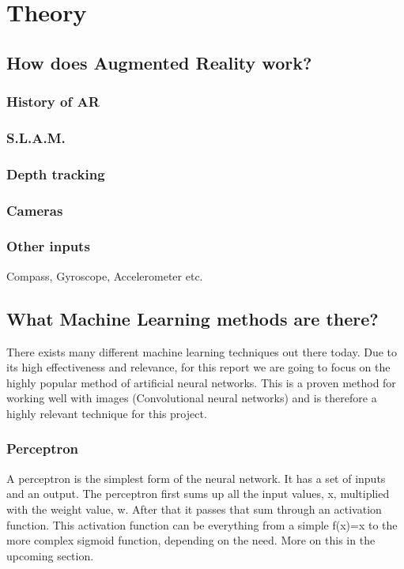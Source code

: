 \section{Theory}

\subsection{How does Augmented Reality work?}

\subsubsection{History of AR}

\subsubsection{S.L.A.M.}

\subsubsection{Depth tracking}

\subsubsection{Cameras}

\subsubsection{Other inputs}
Compass, Gyroscope, Accelerometer  etc.

\subsection{What Machine Learning methods are there?}
There exists many different machine learning techniques out there today. Due to its high effectiveness and relevance, for this report we are going to focus on the highly popular method of artificial neural networks.
This is a proven method for working well with images (Convolutional neural networks) and is therefore a highly 
relevant technique for this project.

\subsubsection{Perceptron}
A perceptron is the simplest form of the neural network. It has a set of inputs and an output.
The perceptron first sums up all the input values, x, multiplied with the weight value, w.
After that it passes that sum through an activation function. This activation function can be everything from a simple f(x)=x to the more complex sigmoid function, depending on the need. More on this in the upcoming section.


